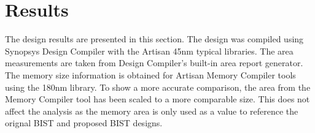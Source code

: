 \chapter{Results}
\label{chap:results}
The design results are presented in this section.  The design was compiled using Synopsys Design Compiler with the Artisan 45nm typical libraries.  The area measurements are taken from Design Compiler's built-in area report generator.  The memory size information is obtained for Artisan Memory Compiler tools using the 180nm library.  To show a more accurate comparison, the area from the Memory Compiler tool has been scaled to a more comparable size.  This does not affect the analysis as the memory area is only used as a value to reference the orignal BIST and proposed BIST designs.  




